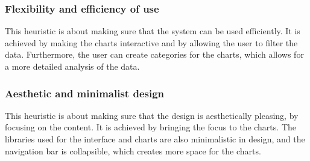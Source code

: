 \subsubsection{Flexibility and efficiency of use}\label{subsubsec:flexibility-and-efficiency-of-use}

This heuristic is about making sure that the system can be used efficiently.
It is achieved by making the charts interactive and by allowing the user to filter the data.
Furthermore, the user can create categories for the charts, which allows for a more detailed analysis of the data.

\subsubsection{Aesthetic and minimalist design}\label{subsubsec:aesthetic-and-minimalist-design}

This heuristic is about making sure that the design is aesthetically pleasing, by focusing on the content.
It is achieved by bringing the focus to the charts.
The libraries used for the interface and charts are also minimalistic in design, and the navigation bar is collapsible,
which creates more space for the charts.
